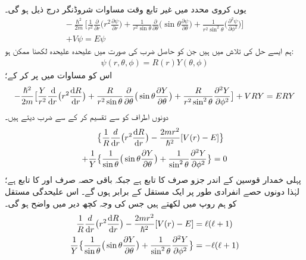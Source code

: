 یوں کروی محدد میں غیر تابع وقت مساوات شروڈنگر درج ذیل ہو گی۔ 
\begin{multline}\label{مساوات_ابعادی_لاپلاسی_ب}
-\frac{\hslash^{2}}{2m}\big [\frac{1}{r^{2}}\frac{\partial}{\partial{r}}\big (r^{2}\frac{\partial\psi}{\partial{r}}\big )+\frac{1}{r^{2}\sin{\theta}}\frac{\partial}{\partial{\theta}}\big(\sin{\theta}\frac{\partial\psi}{\partial{\theta}}\big )+\frac{1}{r^{2}\sin^{2}{\theta}}\big(\frac{\partial^{2}\psi}{\partial{\phi^{2}}}\big )\big ]\\
+V\psi=E\psi 
\end{multline}
ہم ایسے حل کی تلاش میں ہیں جن کو حاصل ضرب کی صورت میں علیحدہ علیحدہ لکھنا ممکن ہو:
\begin{align}
\psi(r,\theta,\phi)=R(r)Y(\theta,\phi) 
\end{align}
اس کو مساوات  میں پر کر کے؛
\begin{multline*}
-\frac{\hslash^{2}}{2m}\big [\frac{Y}{r^{2}}\frac{\dif}{\dif{r}}\big (r^{2}\frac{\dif{R}}{\dif{r}}\big )+\frac{R}{r^{2}\sin{\theta}}\frac{\partial}{\partial{\theta}}\big(\sin{\theta}\frac{\partial{Y}}{\partial{\theta}}\big )+\frac{R}{r^{2}\sin^{2}{\theta}}\frac{\partial^{2}{Y}}{\partial{\phi^{2}}}\big ]+VRY=ERY 
\end{multline*}
دونوں اطراف کو  سے تقسیم کر کے  سے ضرب دیتے ہیں۔
\begin{align*}
&\big\{\frac{1}{R}\frac{d}{\dif{r}}\big(r^{2}\frac{\dif{R}}{\dif{r}}\big)-\frac{2mr^{2}}{\hslash^{2}}[V(r)-E]\big\} \\
+\frac{1}{Y}&\big\{\frac{1}{\sin{\theta}}\big(\sin{\theta}\frac{\partial{Y}}{\partial{\theta}}\big)+\frac{1}{\sin^{2}{\theta}}\frac{\partial^{2}{Y}}{\partial{\phi^{2}}}\big\}=0 
\end{align*}
پہلی خمدار قوسین کے اندر جزو صرف  کا تابع ہے جبکہ باقی حصہ صرف  اور  کا تابع ہے؛ لہٰذا دونوں حصے انفرادی طور پر ایک مستقل کے برابر ہوں گے۔ اس علیحدگی مستقل کو ہم  روپ میں لکھتے ہیں جس کی وجہ کچھ دیر میں واضح ہو گی۔
\begin{align}
\frac{1}{R}\frac{d}{\dif{r}}\big(r^{2}\frac{\dif{R}}{\dif{r}}\big)-\frac{2mr^{2}}{\hslash^{2}}[V(r)-E]&=\ell(\ell+1)\label{مساوات_ابعاد_رداسی_الف} \\ 
\frac{1}{Y}\big\{\frac{1}{\sin{\theta}}\big(\sin{\theta}\frac{\partial{Y}}{\partial{\theta}}\big)+\frac{1}{\sin^{2}{\theta}}\frac{\partial^{2}{Y}}{\partial{\phi^{2}}}\big\}&=-\ell(\ell+1) \label{مساوات_ابعاد_غیر_رداسی_الف}
\end{align}
